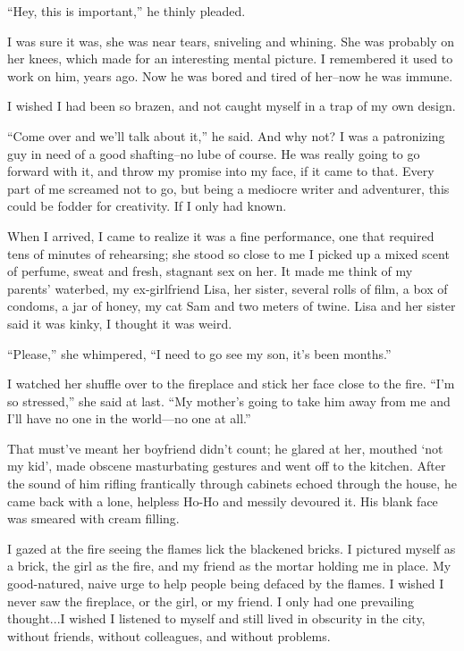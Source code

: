 \documentclass[
]{article}
\begin{document}
``Hey, this is important,'' he thinly pleaded.

I was sure it was, she was near tears, sniveling and whining. She was
probably on her knees, which made for an interesting mental picture. I
remembered it used to work on him, years ago. Now he was bored and tired
of her--now he was immune.

I wished I had been so brazen, and not caught myself in a trap of my own
design.

``Come over and we'll talk about it,'' he said. And why not? I was a
patronizing guy in need of a good shafting--no lube of course. He was
really going to go forward with it, and throw my promise into my face,
if it came to that. Every part of me screamed not to go, but being a
mediocre writer and adventurer, this could be fodder for creativity. If
I only had known.

When I arrived, I came to realize it was a fine performance, one that
required tens of minutes of rehearsing; she stood so close to me I
picked up a mixed scent of perfume, sweat and fresh, stagnant sex on
her. It made me think of my parents' waterbed, my ex-girlfriend Lisa,
her sister, several rolls of film, a box of condoms, a jar of honey, my
cat Sam and two meters of twine. Lisa and her sister said it was kinky,
I thought it was weird.

``Please,'' she whimpered, ``I need to go see my son, it's been
months.''

I watched her shuffle over to the fireplace and stick her face close to
the fire. ``I'm so stressed,'' she said at last. ``My mother's going to
take him away from me and I'll have no one in the world---no one at
all.''

That must've meant her boyfriend didn't count; he glared at her, mouthed
`not my kid', made obscene masturbating gestures and went off to the
kitchen. After the sound of him rifling frantically through cabinets
echoed through the house, he came back with a lone, helpless Ho-Ho and
messily devoured it. His blank face was smeared with cream filling.

I gazed at the fire seeing the flames lick the blackened bricks. I
pictured myself as a brick, the girl as the fire, and my friend as the
mortar holding me in place. My good-natured, naive urge to help people
being defaced by the flames. I wished I never saw the fireplace, or the
girl, or my friend. I only had one prevailing thought...I wished I
listened to myself and still lived in obscurity in the city, without
friends, without colleagues, and without problems.
\end{document}
